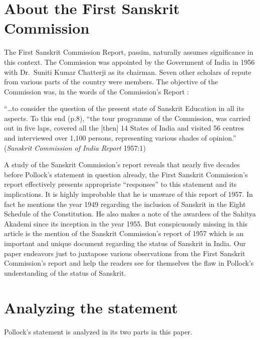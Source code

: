 \section{About the First Sanskrit Commission}

The First Sanskrit Commission Report, passim, naturally assumes significance in this context. The Commission was appointed by the Government of India in 1956 with Dr.\ Suniti Kumar Chatterji as its chairman. Seven other scholars of repute from various parts of the country were members. The objective of the Commission was, in the words of the Commission’s Report :
\smallskip

\begin{myquote}
\eleven
“…to consider the question of the present state of Sanskrit Education in all its aspects. To this end (p.8), “the tour programme of the Commission, was carried out in five laps, covered all the [then] 14 States of India and  visited 56 centres and interviewed over 1,100 persons, representing various shades of opinion.” \hfill({\sl Sanskrit Commission of India Report} 1957:1)
\end{myquote}
\smallskip

A study of the Sanskrit Commission’s report reveals that nearly five decades before Pollock’s statement in question already, the First Sanskrit Commission’s report effectively presents appropriate “responses” to this statement and its implications. It is highly improbable that he is unaware of this report of 1957. In fact he mentions the year 1949 regarding the inclusion of Sanskrit in the Eight Schedule of the Constitution. He also makes a note of the awardees of the Sahitya Akademi since its inception in the year 1955. But conspicuously missing in this article is the mention of the Sanskrit Commission’s report of 1957 which is an important and unique document regarding the status of Sanskrit in India.  Our paper endeavors just to juxtapose various observations from the First Sanskrit Commission’s report and help the readers see for themselves the flaw in Pollock’s understanding of the status of Sanskrit.

\section{Analyzing the statement}

Pollock’s statement is analyzed in its two parts in this paper. 

